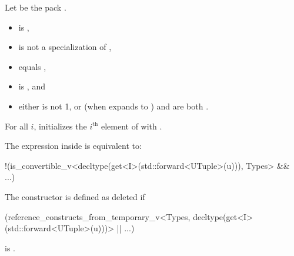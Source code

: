 \begin{itemdescr}
\pnum
Let  be the pack .

\pnum
\constraints
\begin{itemize}
\item
{}
is ,

\item
{}
is not a specialization of ,

\item
{}
equals ,

\item
{}
is\linebreak{} %
, and

\item
either  is not 1, or
(when  expands to )
 and
 are both .
\end{itemize}

\pnum
\effects
For all $i$, initializes the $i^\text{th}$ element of  with
.

\pnum
\remarks
The expression inside  is equivalent to:
\begin{codeblock}
!(is_convertible_v<decltype(get<I>(std::forward<UTuple>(u))), Types> && ...)
\end{codeblock}
The constructor is defined as deleted if
\begin{codeblock}
(reference_constructs_from_temporary_v<Types, decltype(get<I>(std::forward<UTuple>(u)))>
 || ...)
\end{codeblock}
is .
\end{itemdescr}

